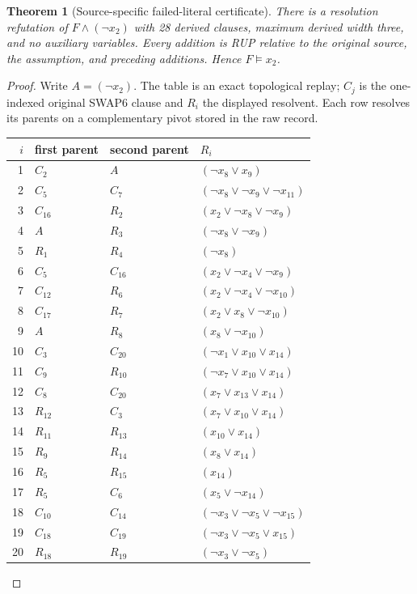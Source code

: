 \documentclass[10pt]{article}
\newtheorem{theorem}{Theorem}
\begin{document}
\begin{theorem}[Source-specific failed-literal certificate]\label{thm:rup}
There is a resolution refutation of $F\wedge(\neg x_2)$ with 28 derived clauses, maximum derived width three, and no auxiliary variables. Every addition is RUP relative to the original source, the assumption, and preceding additions. Hence $F\models x_2$.
\end{theorem}
\begin{proof}
Write $A=(\neg x_2)$. The table is an exact topological replay; $C_j$ is the one-indexed original SWAP6 clause and $R_i$ the displayed resolvent. Each row resolves its parents on a complementary pivot stored in the raw record.
\begin{center}\scriptsize
\begin{longtable}{rlll}
\toprule $i$&first parent&second parent&$R_i$\\\midrule
1&$C_2$&$A$&$(\neg x_8\vee x_9)$\\
2&$C_5$&$C_7$&$(\neg x_8\vee\neg x_9\vee\neg x_{11})$\\
3&$C_{16}$&$R_2$&$(x_2\vee\neg x_8\vee\neg x_9)$\\
4&$A$&$R_3$&$(\neg x_8\vee\neg x_9)$\\
5&$R_1$&$R_4$&$(\neg x_8)$\\
6&$C_5$&$C_{16}$&$(x_2\vee\neg x_4\vee\neg x_9)$\\
7&$C_{12}$&$R_6$&$(x_2\vee\neg x_4\vee\neg x_{10})$\\
8&$C_{17}$&$R_7$&$(x_2\vee x_8\vee\neg x_{10})$\\
9&$A$&$R_8$&$(x_8\vee\neg x_{10})$\\
10&$C_3$&$C_{20}$&$(\neg x_1\vee x_{10}\vee x_{14})$\\
11&$C_9$&$R_{10}$&$(\neg x_7\vee x_{10}\vee x_{14})$\\
12&$C_8$&$C_{20}$&$(x_7\vee x_{13}\vee x_{14})$\\
13&$R_{12}$&$C_3$&$(x_7\vee x_{10}\vee x_{14})$\\
14&$R_{11}$&$R_{13}$&$(x_{10}\vee x_{14})$\\
15&$R_9$&$R_{14}$&$(x_8\vee x_{14})$\\
16&$R_5$&$R_{15}$&$(x_{14})$\\
17&$R_5$&$C_6$&$(x_5\vee\neg x_{14})$\\
18&$C_{10}$&$C_{14}$&$(\neg x_3\vee\neg x_5\vee\neg x_{15})$\\
19&$C_{18}$&$C_{19}$&$(\neg x_3\vee\neg x_5\vee x_{15})$\\
20&$R_{18}$&$R_{19}$&$(\neg x_3\vee\neg x_5)$\\

\end{longtable}
\end{center}
\end{proof}
\end{document}
